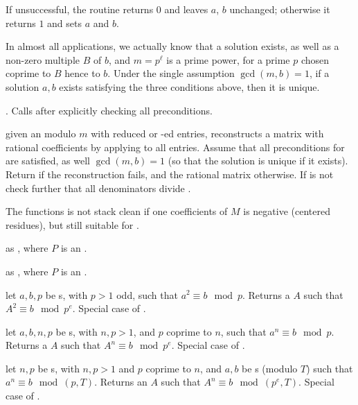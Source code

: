 \noindent If unsuccessful, the routine returns $0$ and leaves $a$, $b$
unchanged; otherwise it returns $1$ and sets $a$ and $b$.

In almost all applications, we actually know that a solution exists, as well
as a non-zero multiple $B$ of $b$, and $m = p^\ell$ is a prime power, for a
prime $p$ chosen coprime to $B$ hence to $b$. Under the single assumption
$\gcd(m,b) = 1$, if a solution $a,b$ exists satisfying the three conditions
above, then it is unique.

.
Calls  after explicitly checking all preconditions.

given an  modulo $m$ with reduced or -ed entries,
reconstructs a matrix with rational coefficients by applying 
to all entries. Assume that all preconditions for  are
satisfied, as well $\gcd(m,b) = 1$ (so that the solution is unique if it
exists). Return  if the reconstruction fails, and the rational
matrix otherwise. If  is not  check further that all
denominators divide .

The functions is not stack clean if one coefficients of $M$ is negative
(centered residues), but still suitable for .

 as
, where $P$ is an .

 as
, where $P$ is an .


 let
$a,b,p$ be s, with $p > 1$ odd, such that $a^2\equiv b\mod p$.
Returns a  $A$ such that $A^2 \equiv b \mod p^e$. Special case
of .

 let
$a,b,n,p$ be s, with $n,p > 1$, and $p$ coprime to $n$,
such that $a^n \equiv b \mod p$. Returns a  $A$ such that
$A^n \equiv b \mod p^e$. Special case of .

 let
$n,p$ be s, with $n,p > 1$ and $p$ coprime to $n$, and $a,b$
be s (modulo $T$) such that $a^n \equiv b \mod (p,T)$.
Returns an  $A$ such that $A^n \equiv b \mod (p^e, T)$.
Special case of .

